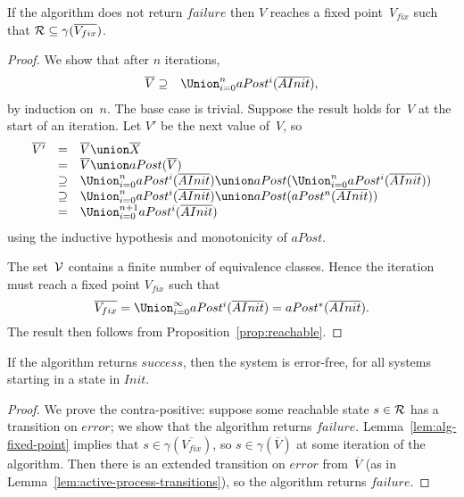 \begin{lemma}
\label{lem:alg-fixed-point}
If the algorithm does not return $failure$ then $V$ reaches a fixed
point~$V_{fix}$ such that 
$\mathcal{R} \subseteq \gamma( \overline{V_{fix}} )$.
\end{lemma}
%
\begin{proof}
We show that after $n$ iterations,
\begin{eqnarray*}
\overline{V} & \supseteq & \textstyle\Union_{i = 0}^n aPost^i(\overline{AInit}),
\end{eqnarray*}
%
by induction on~$n$.  The base case is trivial.  Suppose the result holds
for~$V$ at the start of an iteration.  Let $V'$ be the next value of~$V$, so
\[
\begin{array}{rcl}
\overline{V'} & = & \overline{V} \union \overline{X} \\ 
& = & \overline{V} \union aPost(\overline{V}) \\
& \supseteq & \Union_{i = 0}^n aPost^i(\overline{AInit}) \union
      aPost(\Union_{i = 0}^n aPost^i(\overline{AInit})) \\
& \supseteq & \Union_{i = 0}^n aPost^i(\overline{AInit}) \union 
  aPost(aPost^n(\overline{AInit})) \\
& = & \Union_{i = 0}^{n+1} aPost^i(\overline{AInit})
\end{array}
\] 
using the inductive hypothesis and monotonicity of $aPost$. 

The set~$\mathcal{V}$ contains a finite number of equivalence classes.  Hence the
iteration must reach a fixed point $V_{fix}$ such that
\[
\overline{V_{fix}} = \textstyle\Union_{i = 0}^\infty aPost^i(\overline{AInit}) = 
  aPost^*(\overline{AInit}).
\]
The result then follows from Proposition~\ref{prop:reachable}.
\end{proof}


\begin{prop}
If the algorithm returns $success$, then the system is error-free, for all
systems starting in a state in $Init$.
\end{prop}
%
\begin{proof}
We prove the contra-positive: suppose some reachable state $s \in \mathcal{R}$ has a
transition on $error$; we show that the algorithm returns $failure$.  
%
Lemma~\ref{lem:alg-fixed-point} implies that $s \in
\gamma(\overline{V_{fix}})$, so $s \in \gamma(\overline{V})$ at some iteration
of the algorithm.  Then there is an extended transition on $error$
from~$\overline{V}$ (as in Lemma~\ref{lem:active-process-transitions}), so the
algorithm returns $failure$.
\end{proof}

